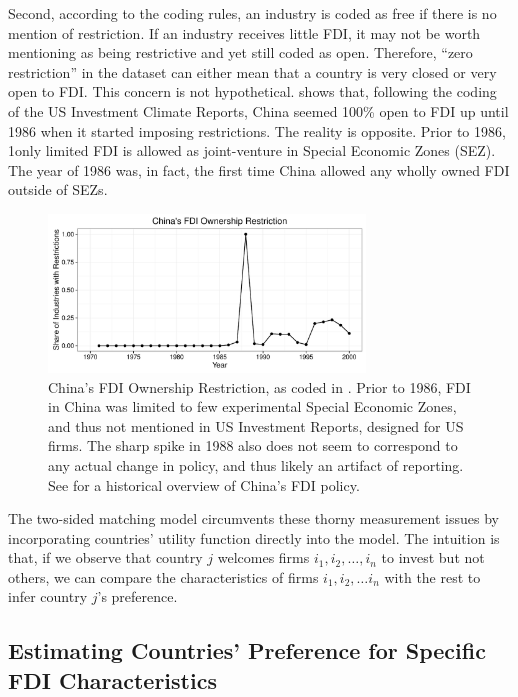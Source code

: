 Second, according to the coding rules, an industry is coded as free if there is no mention of restriction. If an industry receives little FDI, it may not be worth mentioning as being restrictive and yet still coded as open. Therefore, ``zero restriction'' in the dataset can either mean that a country is very closed or very open to FDI. This concern is not hypothetical.  shows that, following the coding of the US Investment Climate Reports, China seemed 100\% open to FDI up until 1986 when it started imposing restrictions. The reality is opposite. Prior to 1986, 1only limited FDI is allowed as joint-venture in Special Economic Zones (SEZ). The year of 1986 was, in fact, the first time China allowed any wholly owned FDI outside of SEZs.

\begin{figure}[!ht]
\centering
\includegraphics[width=0.75\textwidth,keepaspectratio]{../figure/china_fdi_restriction}
\caption{China's FDI Ownership Restriction, as coded in \citet{Pandya2010}. Prior to 1986, FDI in China was limited to few experimental Special Economic Zones, and thus not mentioned in US Investment Reports, designed for US firms. The sharp spike in 1988 also does not seem to correspond to any actual change in policy, and thus likely an artifact of reporting. See \citet{Zebregs2002} for a historical overview of China's FDI policy.}
\label{fig:china_fdi_restriction}
\end{figure}

The two-sided matching model circumvents these thorny measurement issues by incorporating countries' utility function directly into the model. The intuition is that, if we observe that country $j$ welcomes firms $i_1, i_2, \dots, i_n$ to invest but not others, we can compare the characteristics of firms $i_1, i_2, \dots i_n$ with the rest to infer country $j$'s preference.


\subsection{Estimating Countries' Preference for Specific FDI Characteristics}

